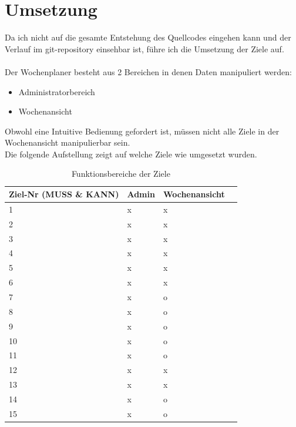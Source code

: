 \section{Umsetzung}
Da ich nicht auf die gesamte Entstehung des Quellcodes eingehen kann und der Verlauf im git-repository einsehbar ist,
führe ich die Umsetzung der Ziele auf.\\\\
Der Wochenplaner besteht aus 2 Bereichen in denen Daten manipuliert werden:
\begin{itemize}
    \item Administratorbereich
    \item Wochenansicht\\
\end{itemize}
Obwohl eine Intuitive Bedienung gefordert ist, müssen nicht alle Ziele in der Wochenansicht manipulierbar sein.\\
Die folgende Aufstellung zeigt auf welche Ziele wie umgesetzt wurden.\\

\begin{table}[!ht]
\begin{center}
    \begin{longtable}{llp{3cm}l}
        \toprule Ziel-Nr (MUSS \& KANN) & Admin & Wochenansicht \\
        \midrule 1 & x & x \\
        \midrule 2 & x & x \\
        \midrule 3 & x & x \\
        \midrule 4 & x & x \\
        \midrule 5 & x & x \\
        \midrule 6 & x & x \\ 
        \midrule 7 & x & o \\
        \midrule 8 & x & o \\
        \midrule 9 & x & o \\
        \midrule 10 & x & o \\
        \midrule 11 & x & o \\
        \midrule 12 & x & x \\
        \midrule 13 & x & x \\
        \midrule 14 & x & o \\
        \midrule 15 & x & o \\
        \bottomrule
        \end{longtable}
    \caption{Funktionsbereiche der Ziele}
    \label{tab:funktionsbereiche_ziele}
\end{center}
\end{table}

